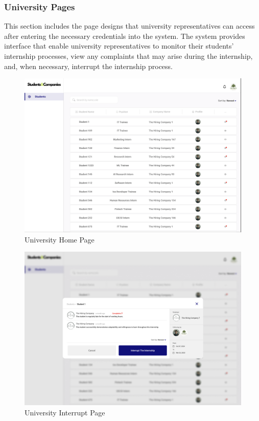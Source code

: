 \documentclass[a4paper,12pt]{article}
\begin{document}
\subsubsection*{University Pages}
This section includes the page designs that university representatives can access after entering the necessary credentials into the system. The system provides interface that enable university representatives to monitor their students' internship processes, view any complaints that may arise during the internship, and, when necessary, interrupt the internship process.
\begin{figure}[H]
    \centering
    \includegraphics[scale = 0.40]{figures/UserInterfaces/University/UniversityHomePage.png}
    \caption{University Home Page}
     \centering
\end{figure}
\begin{figure}[H]
    \centering
    \includegraphics[scale = 0.40]{figures/UserInterfaces/University/InterruptPage.png}
    \caption{University Interrupt Page}
     \centering
\end{figure}
\end{document}
